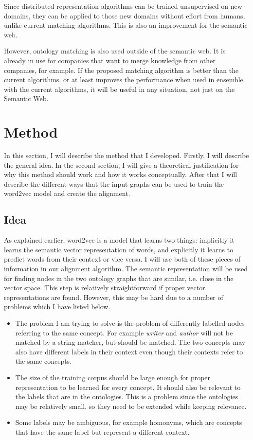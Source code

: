 \documentclass{article}
\begin{document}
 Since distributed representation algorithms can be trained unsupervised on new domains, they can be applied to those new domains without effort from humans, unlike current matching algorithms. This is also an improvement for the semantic web.
 
 However, ontology matching is also used outside of the semantic web. It is already in use for companies that want to merge knowledge from other companies, for example. If the proposed matching algorithm is better than the current algorithms, or at least improves the performance when used in ensemble with the current algorithms, it will be useful in any situation, not just on the Semantic Web.
 \section{Method}
 In this section, I will describe the method that I developed. Firstly, I will describe the general idea. In the second section, I will give a theoretical justification for why this method should work and how it works conceptually. After that I will describe the different ways that the input graphs can be used to train the word2vec model and create the alignment. 
 \subsection{Idea}
 As explained earlier, word2vec is a model that learns two things: implicitly it learns the semantic vector representation of words, and explicitly it learns to predict words from their context or vice versa. I will use both of these pieces of information in our alignment algorithm.
 The semantic representation will be used for finding nodes in the two ontology graphs that are similar, i.e. close in the vector space. This step is relatively straightforward if proper vector representations are found. However, this may be hard due to a number of problems which I have listed below.

 \begin{itemize}
  \item The problem I am trying to solve is the problem of differently labelled nodes referring to the same concept. For example \emph{writer} and \emph{author} will not be matched by a string matcher, but should be matched. The two concepts may also have different labels in their context even though their contexts refer to the same concepts.
  \item The size of the training corpus should be large enough for proper representation to be learned for every concept. It should also be relevant to the labels that are in the ontologies. This is a problem since the ontologies may be relatively small, so they need to be extended while keeping relevance.
  \item Some labels may be ambiguous, for example homonyms, which are concepts that have the same label but represent a different context.
 \end{itemize}
 
\end{document}

